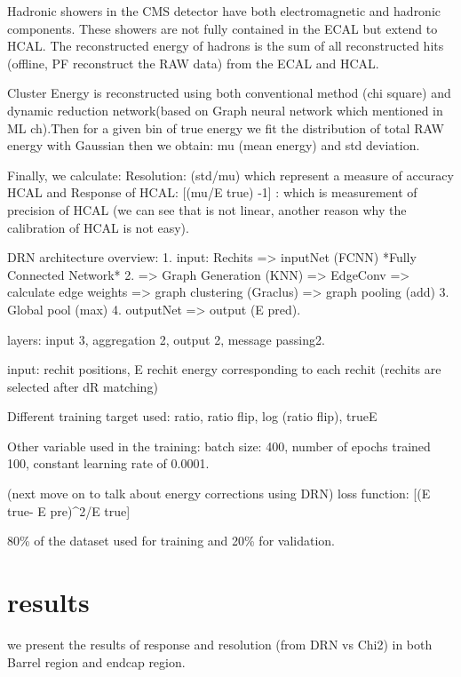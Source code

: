 Hadronic showers in the CMS detector have both electromagnetic and hadronic components. These showers are not fully contained in the ECAL but extend to HCAL. The reconstructed energy of hadrons is the sum of all reconstructed hits (offline, PF reconstruct the RAW data) from the ECAL and HCAL. 


Cluster Energy is reconstructed using both conventional method (chi square) and dynamic reduction network(based on Graph neural network which mentioned in ML ch).Then for a given bin of true energy we fit the distribution of total RAW energy with Gaussian then we obtain: mu (mean energy) and std deviation.

Finally, we calculate: Resolution: (std/mu) which represent a measure of accuracy HCAL 
and Response of HCAL:  [(mu/E true) -1] : which is measurement of precision of HCAL 
(we can see that is not linear, another reason why the calibration of HCAL is not easy).

DRN architecture overview:
1. input: Rechits => inputNet (FCNN) *Fully Connected Network*
2. => Graph Generation (KNN) => EdgeConv => calculate edge weights => graph clustering (Graclus) => graph pooling (add)
3. Global pool (max) 4. outputNet => output (E pred).

layers: input 3, aggregation 2, output 2, message passing2.

input: rechit positions, E rechit energy corresponding to each rechit (rechits are selected after dR matching)

Different training target used: ratio, ratio flip, log (ratio flip), trueE

Other variable used in the training: batch size: 400, number of epochs trained 100, constant learning rate of 0.0001.

(next move on to talk about energy corrections using DRN) loss function:  [(E true- E pre)^2/E true]

80\% of the dataset used for training and 20\% for validation.

\section{results}
we present the results of response and resolution (from DRN vs Chi2) in  both Barrel region and endcap region.

